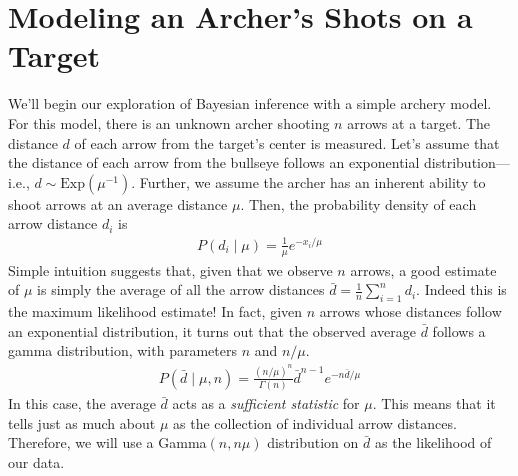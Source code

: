 \section{Modeling an Archer's Shots on a Target}\label{sect:Exercise}

\begin{figure}[h!]
\centering
{}
\label{fig:archery_model}
\end{figure}

We'll begin our exploration of Bayesian inference with a simple archery model.
For this model, there is an unknown archer shooting $n$ arrows at a target. 
The distance $d$ of each arrow from the target's center is measured.
Let's assume that the distance of each arrow from the bullseye follows an exponential distribution---i.e., $d\sim\mbox{Exp}(\mu^{-1})$.
Further, we assume the archer has an inherent ability to shoot arrows at an average distance $\mu$.
Then, the probability density of each arrow distance $d_i$ is
\begin{align*}
P(d_i \mid \mu) = \frac{1}{\mu} e^{-x_i/\mu}
\end{align*}
Simple intuition suggests that, given that we observe $n$ arrows, a good estimate of $\mu$ is simply the average of all the arrow distances $\bar d = \frac{1}{n}\sum_{i=1}^n d_i$.
Indeed this is the maximum likelihood estimate!
In fact, given $n$ arrows whose distances follow an exponential distribution, it turns out that the observed average $\bar d$ follows a gamma distribution, with parameters $n$ and $n/\mu$.
\begin{align*}
P(\bar d \mid \mu,n) = \frac{(n/\mu)^n}{\Gamma(n)} {\bar d}^{n-1}e^{-n\bar d /\mu}
\end{align*}
In this case, the average $\bar d$ acts as a \emph{sufficient statistic} for $\mu$. This means that it tells just as much about $\mu$ as the collection of individual arrow distances.
Therefore, we will use a Gamma$(n, n\mu)$ distribution on $\bar d$ as the likelihood of our data.

